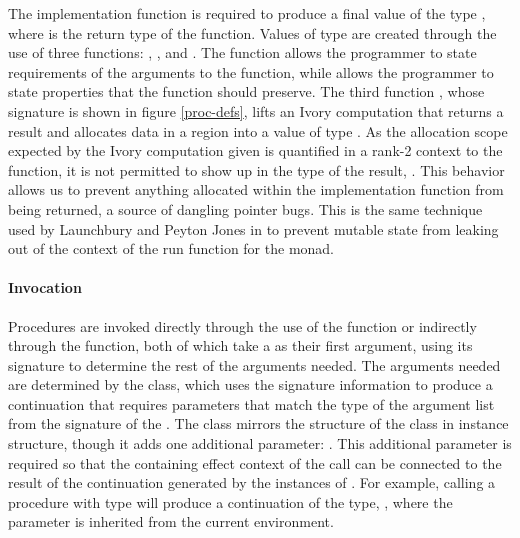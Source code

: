The implementation function is required to produce a final value of the type
, where  is the return type of the function.  Values of type
 are created through the use of three functions: ,
, and .  The  function allows the programmer
to state requirements of the arguments to the function, while 
allows the programmer to state properties that the function should preserve. The
third function , whose signature is shown in figure \ref{proc-defs},
lifts an Ivory computation that returns a result  and allocates data in a
region  into a value of type .  As the allocation scope
expected by the Ivory computation given is quantified in a rank-2 context to the
 function, it is not permitted to show up in the type of the result,
.  This behavior allows us to prevent anything allocated within the
implementation function from being returned, a source of dangling pointer bugs.
This is the same technique used by Launchbury and Peyton Jones in \cite{stmonad}
to prevent mutable state from leaking out of the context of the run function for
the  monad.

\paragraph{Invocation} Procedures are invoked directly through the use of the
 function or indirectly through the  function, both of which
take a  as their first argument, using its signature to determine the
rest of the arguments needed.  The arguments needed are determined by the
 class, which uses the signature information to produce a
continuation that requires parameters that match the type of the argument list
from the signature of the .  The  class mirrors the
structure of the  class in instance structure, though it adds
one additional parameter: .  This additional parameter is required so
that the containing effect context of the call can be connected to the result of
the continuation generated by the instances of .  For example,
calling a procedure with type  will produce a
continuation of the type, , where the 
parameter is inherited from the current environment.



